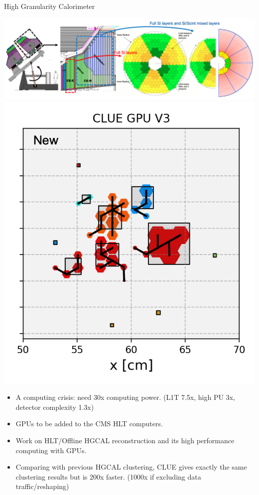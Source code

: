 \begin{frame}{High Granularity Calorimeter}
\smaller
    \begin{center}
        \includegraphics[height=0.32\textheight]{chapters/HGCal/figures/chep/hgcal2.png}
        \includegraphics[height=0.3\textheight]{slides/figures/clue.png}
    \end{center}
    
    \begin{itemize} 
    \smaller
        \item A computing crisis: need 30x computing power. (L1T 7.5x, high PU 3x, detector complexity 1.3x)
        \item GPUs to be added to the CMS HLT computers.
        \item Work on HLT/Offline HGCAL reconstruction and its high performance computing with GPUs.
        \item Comparing with previous HGCAL clustering, CLUE gives exactly the same clustering results but is 200x faster. (1000x if excluding data traffic/reshaping)
    \end{itemize}
    

\end{frame}
